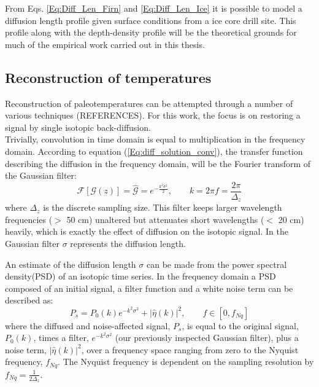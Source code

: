 \documentclass[../../CompleteThesis2/Complete_2ndDraft]{subfiles}
\begin{document}
From Eqs. \ref{Eq:Diff_Len_Firn} and \ref{Eq:Diff_Len_Ice} it is possible to model a diffusion length profile given surface conditions from a ice core drill site. This profile along with the depth-density profile will be the theoretical grounds for much of the empirical work carried out in this thesis.

\subsection{Reconstruction of temperatures}
\label{Subsec:Ice_DiffusionAndDensification_Diffusion_TemperatureRecon}
Reconstruction of paleotemperatures can be attempted through a number of various techniques (REFERENCES). For this work, the focus is on restoring a signal by single isotopic back-diffusion.\\
Trivially, convolution in time domain is equal to multiplication in the frequency domain. According to equation (\ref{Eq:diff_solution_conv}), the transfer function describing the diffusion in the frequency domain, will be the Fourier transform of the Gaussian filter:
\begin{equation}
	\mathcal{F}[\mathcal{G}(z)] = \hat{\mathcal{G}} = e^{-\frac{k^2\sigma^2}{2}}, \qquad k = 2\pi f = \frac{2\pi}{\Delta_z}
	\label{Eq:Transer_Fct}
\end{equation} 
where $\Delta_z$ is the discrete sampling size. This filter keeps larger wavelength frequencies ($>$ 50 cm) unaltered but attenuates short wavelengths ($<$ 20 cm) heavily, which is exactly the effect of diffusion on the isotopic signal. In the Gaussian filter $\sigma$ represents the diffusion length.

An estimate of the diffusion length $\sigma$ can be made from the power spectral density(PSD) of an isotopic time series. In the frequency domain a PSD composed of an initial signal, a filter function and a white noise term can be described as:
\begin{equation}
	P_s = P_0(k) e^{-k^2\sigma^2} + |\hat{\eta}(k)|^2, \qquad f \in [0, f_{Nq}]
	\label{Eq:PSD_general}
\end{equation} 
where the diffused and noise-affected signal, $P_s$, is equal to the original signal, $P_0(k)$, times a filter, $e^{-k^2\sigma^2}$ (our previously inspected Gaussian filter), plus a noise term, $|\hat{\eta}(k)|^2$, over a frequency space ranging from zero to the Nyquist frequency, $f_{Nq}$. The Nyquist frequency is dependent on the sampling resolution by $f_{Nq} = \frac{1}{2\Delta_z}$.
\end{document}
